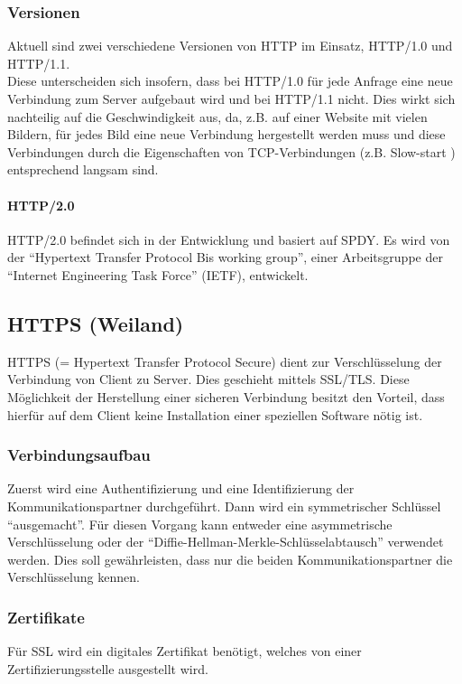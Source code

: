 \subsubsection{Versionen}
Aktuell sind zwei verschiedene Versionen von HTTP im Einsatz, HTTP/1.0 und HTTP/1.1.
\\
Diese unterscheiden sich insofern, dass bei HTTP/1.0 für jede Anfrage eine neue Verbindung zum Server aufgebaut wird und bei HTTP/1.1 nicht. Dies wirkt sich nachteilig auf die Geschwindigkeit aus, da, z.B. auf einer Website mit vielen Bildern, für jedes Bild eine neue Verbindung hergestellt werden muss und diese Verbindungen durch die Eigenschaften von TCP-Verbindungen (z.B. Slow-start ) entsprechend langsam sind.

\paragraph{HTTP/2.0}  HTTP/2.0 befindet sich in der Entwicklung und basiert auf SPDY. Es wird von der \enquote{Hypertext Transfer Protocol Bis working group}, einer Arbeitsgruppe der \enquote{Internet Engineering Task Force} (IETF), entwickelt.

\subsection{HTTPS (Weiland)}
HTTPS (= Hypertext Transfer Protocol Secure) dient zur Verschlüsselung der Verbindung von Client zu Server. Dies geschieht mittels SSL/TLS. Diese Möglichkeit der Herstellung einer sicheren Verbindung besitzt den Vorteil, dass hierfür auf dem Client keine Installation einer speziellen Software nötig ist.
\subsubsection{Verbindungsaufbau}
Zuerst wird eine Authentifizierung und eine Identifizierung der Kommunikationspartner durchgeführt. Dann wird ein symmetrischer Schlüssel \enquote{ausgemacht}. Für diesen Vorgang kann entweder eine asymmetrische Verschlüsselung oder der \enquote{Diffie-Hellman-Merkle-Schlüsselabtausch} verwendet werden. Dies soll gewährleisten, dass nur die beiden Kommunikationspartner die Verschlüsselung kennen.
\subsubsection{Zertifikate}
Für SSL wird ein digitales Zertifikat benötigt, welches von einer Zertifizierungsstelle ausgestellt wird.
